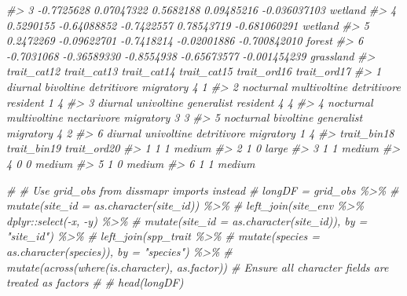 \documentclass[
]{article}
\newenvironment{Shaded}{\begin{snugshade}}{\end{snugshade}}
\newcommand{\CommentTok}[1]{\textcolor[rgb]{0.56,0.35,0.01}{\textit{#1}}}
\begin{document}
\begin{Shaded}
\begin{Highlighting}[]
\CommentTok{\#\textgreater{} 3  {-}0.7725628  0.07047322   0.5682188  0.09485216 {-}0.036037103     wetland}
\CommentTok{\#\textgreater{} 4   0.5290155 {-}0.64088852  {-}0.7422557  0.78543719 {-}0.681060291     wetland}
\CommentTok{\#\textgreater{} 5   0.2472269 {-}0.09622701  {-}0.7418214 {-}0.02001886 {-}0.700842010      forest}
\CommentTok{\#\textgreater{} 6  {-}0.7031068 {-}0.36589330  {-}0.8554938 {-}0.65673577 {-}0.001454239   grassland}
\CommentTok{\#\textgreater{}   trait\_cat12  trait\_cat13 trait\_cat14 trait\_cat15 trait\_ord16 trait\_ord17}
\CommentTok{\#\textgreater{} 1     diurnal    bivoltine detritivore   migratory           4           1}
\CommentTok{\#\textgreater{} 2   nocturnal multivoltine detritivore    resident           1           4}
\CommentTok{\#\textgreater{} 3     diurnal   univoltine  generalist    resident           4           4}
\CommentTok{\#\textgreater{} 4   nocturnal multivoltine nectarivore   migratory           3           3}
\CommentTok{\#\textgreater{} 5   nocturnal    bivoltine  generalist   migratory           4           2}
\CommentTok{\#\textgreater{} 6     diurnal   univoltine detritivore   migratory           1           4}
\CommentTok{\#\textgreater{}   trait\_bin18 trait\_bin19 trait\_ord20}
\CommentTok{\#\textgreater{} 1           1           1      medium}
\CommentTok{\#\textgreater{} 2           1           0       large}
\CommentTok{\#\textgreater{} 3           1           1      medium}
\CommentTok{\#\textgreater{} 4           0           0      medium}
\CommentTok{\#\textgreater{} 5           1           0      medium}
\CommentTok{\#\textgreater{} 6           1           1      medium}

\CommentTok{\# \# Use \textasciigrave{}grid\_obs\textasciigrave{} from \textasciigrave{}dissmapr\textasciigrave{} imports instead}
\CommentTok{\# longDF = grid\_obs \%\textgreater{}\%}
\CommentTok{\#   mutate(site\_id = as.character(site\_id)) \%\textgreater{}\%}
\CommentTok{\#   left\_join(site\_env \%\textgreater{}\% dplyr::select({-}x, {-}y) \%\textgreater{}\% }
\CommentTok{\#               mutate(site\_id = as.character(site\_id)), by = "site\_id") \%\textgreater{}\%}
\CommentTok{\#   left\_join(spp\_trait \%\textgreater{}\% }
\CommentTok{\#               mutate(species = as.character(species)), by = "species") \%\textgreater{}\%}
\CommentTok{\#   mutate(across(where(is.character), as.factor))  \# Ensure all character fields are treated as factors}
\CommentTok{\# \# head(longDF)}
\end{Highlighting}
\end{Shaded}
\end{document}
